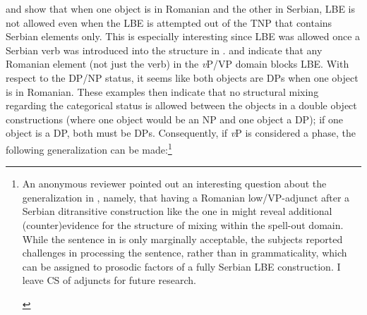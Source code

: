 \documentclass[output=paper,
hidelinks,
newtxmath,
]{langscibook}
\begin{document}
\noindent {} and  show that when one object is in Romanian and the other in Serbian, LBE is not allowed even when the LBE is attempted out of the TNP that contains Serbian elements only. This is especially interesting since LBE was allowed once a Serbian verb was introduced into the structure in .  and  indicate that any Romanian element (not just the verb) in the \textit{v}P/VP domain blocks LBE. With respect to the DP/NP status, it seems like both objects are DPs when one object is in Romanian. These examples then indicate that no structural mixing regarding the categorical status is allowed between the objects in a double object constructions (where one object would be an NP and one object a DP); if one object is a DP, both must be DPs. Consequently, if \textit{v}P is considered a phase, the following generalization can be made:\footnote{\label{fn12}An anonymous reviewer pointed out an interesting question about the generalization in , namely, that having a Romanian low/VP-adjunct after a Serbian ditransitive construction like the one in  might reveal additional (counter)evidence for the structure of mixing within the spell-out domain. While the sentence in  is only marginally acceptable, the subjects reported challenges in processing the sentence, rather than in grammaticality, which can be assigned to prosodic factors of a fully Serbian LBE construction. I leave CS of adjuncts for future research.

\ea\label{fn12ex}
\z\z

}
\end{document}
